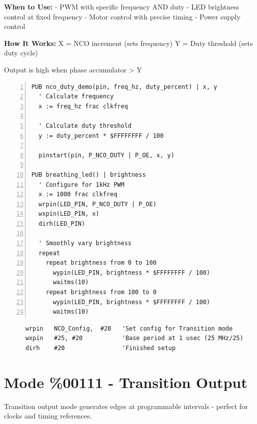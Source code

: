 \documentclass[11pt,a4paper,oneside,english]{book}
\begin{document}
\textbf{When to Use:} - PWM with specific frequency AND duty - LED
brightness control at fixed frequency - Motor control with precise
timing - Power supply control

\textbf{How It Works:} X = NCO increment (sets frequency) Y = Duty
threshold (sets duty cycle)

Output is high when phase accumulator \textgreater{} Y

\begin{Spin2Block}
\begin{Verbatim}[numbers=left,numbersep=5pt,xleftmargin=15pt]
PUB nco_duty_demo(pin, freq_hz, duty_percent) | x, y
  ' Calculate frequency
  x := freq_hz frac clkfreq
  
  ' Calculate duty threshold
  y := duty_percent * $FFFFFFFF / 100
  
  pinstart(pin, P_NCO_DUTY | P_OE, x, y)

PUB breathing_led() | brightness
  ' Configure for 1kHz PWM
  x := 1000 frac clkfreq
  wrpin(LED_PIN, P_NCO_DUTY | P_OE)
  wxpin(LED_PIN, x)
  dirh(LED_PIN)
  
  ' Smoothly vary brightness
  repeat
    repeat brightness from 0 to 100
      wypin(LED_PIN, brightness * $FFFFFFFF / 100)
      waitms(10)
    repeat brightness from 100 to 0  
      wypin(LED_PIN, brightness * $FFFFFFFF / 100)
      waitms(10)
\end{Verbatim}
\end{Spin2Block}

\begin{PASM2Block}
\begin{lstlisting}
      wrpin   NCO_Config,  #20   'Set config for Transition mode
      wxpin   #25, #20           'Base period at 1 usec (25 MHz/25)
      dirh    #20                'Finished setup
\end{lstlisting}
\end{PASM2Block}

\clearpage

\hypertarget{mode-00111---transition-output}{%
\section{Mode \%00111 - Transition
Output}\label{mode-00111---transition-output}}

Transition output mode generates edges at programmable intervals -
perfect for clocks and timing references.
\end{document}
